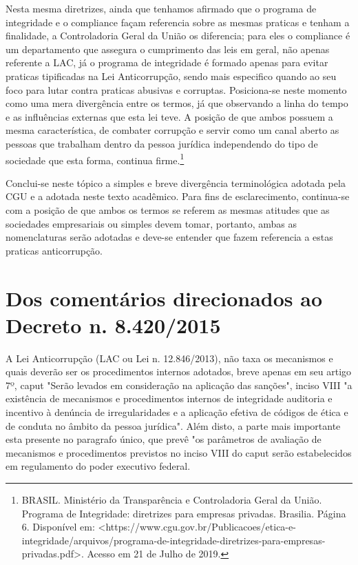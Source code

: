 Nesta mesma diretrizes, ainda que tenhamos afirmado que o programa de integridade e o compliance façam referencia sobre as mesmas praticas e tenham a finalidade, a Controladoria Geral da União os diferencia; para eles o compliance é um departamento que assegura o cumprimento das leis em geral, não apenas referente a LAC, já o programa de integridade é formado apenas para evitar praticas tipificadas na Lei Anticorrupção, sendo mais especifico quando ao seu foco para lutar contra praticas abusivas e corruptas. Posiciona-se neste momento como uma mera divergência entre os termos, já que observando a linha do tempo e as influências externas que esta lei teve. A posição de que ambos possuem a mesma característica, de combater corrupção e servir como um canal aberto as pessoas que trabalham dentro da pessoa jurídica independendo do tipo de sociedade que esta forma, continua firme.\footnote{BRASIL. Ministério da Transparência e Controladoria Geral da União. Programa de Integridade: diretrizes para empresas privadas. Brasilia. Página 6. Disponível em: <https://www.cgu.gov.br/Publicacoes/etica-e-integridade/arquivos/programa-de-integridade-diretrizes-para-empresas-privadas.pdf>. Acesso em 21 de Julho de 2019.}

 Conclui-se neste tópico a simples e breve divergência terminológica adotada pela CGU e a adotada neste texto acadêmico. Para fins de esclarecimento, continua-se com a posição de que ambos os termos se referem as mesmas atitudes que as sociedades empresariais ou simples devem tomar, portanto, ambas as nomenclaturas serão adotadas e deve-se entender que fazem referencia a estas praticas anticorrupção. 

\section{Dos comentários direcionados ao Decreto n. 8.420/2015}

 A Lei Anticorrupção (LAC ou Lei n. 12.846/2013), não taxa os mecanismos e quais deverão ser os procedimentos internos adotados, breve apenas em seu artigo 7º, caput "Serão levados em consideração na aplicação das sanções", inciso VIII "a existência de mecanismos e procedimentos internos de integridade auditoria e incentivo à denúncia de irregularidades e a aplicação efetiva de códigos de ética e de conduta no âmbito da pessoa jurídica". Além disto, a parte mais importante esta presente no paragrafo único, que prevê "os parâmetros de avaliação de mecanismos e procedimentos previstos no inciso VIII do caput serão estabelecidos em regulamento do poder executivo federal. 

